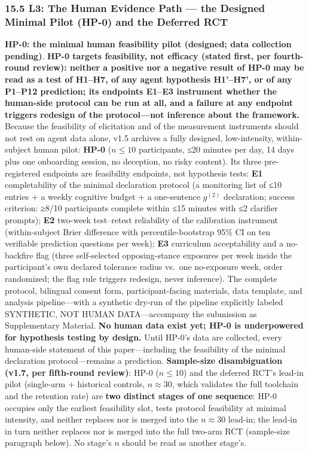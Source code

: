 \documentclass[
  11pt]{article}
\begin{document}
\subsubsection{15.5 L3: The Human Evidence Path --- the Designed Minimal
Pilot (HP-0) and the Deferred
RCT}\label{l3-the-human-evidence-path-the-designed-minimal-pilot-hp-0-and-the-deferred-rct}

\textbf{HP-0: the minimal human feasibility pilot (designed; data
collection pending)}. \textbf{HP-0 targets feasibility, not efficacy
(stated first, per fourth-round review): neither a positive nor a
negative result of HP-0 may be read as a test of H1--H7, of any agent
hypothesis H1'--H7', or of any P1--P12 prediction; its endpoints E1--E3
instrument whether the human-side protocol can be run at all, and a
failure at any endpoint triggers redesign of the protocol---not
inference about the framework.} Because the feasibility of elicitation
and of the measurement instruments should not rest on agent data alone,
v1.5 archives a fully designed, low-intensity, within-subject human
pilot: \textbf{HP-0} (\(n \le 10\) participants, ≤20 minutes per day, 14
days plus one onboarding session, no deception, no risky content). Its
three pre-registered endpoints are feasibility endpoints, not hypothesis
tests: \textbf{E1} completability of the minimal declaration protocol (a
monitoring list of ≤10 entries + a weekly cognitive budget + a
one-sentence \(g^{(2)}\) declaration; success criterion: ≥8/10
participants complete within ≤15 minutes with ≤2 clarifier prompts);
\textbf{E2} two-week test--retest reliability of the calibration
instrument (within-subject Brier difference with percentile-bootstrap
95\% CI on ten verifiable prediction questions per week); \textbf{E3}
curriculum acceptability and a no-backfire flag (three self-selected
opposing-stance exposures per week inside the participant's own declared
tolerance radius vs.~one no-exposure week, order randomized; the flag
rule triggers redesign, never inference). The complete protocol,
bilingual consent form, participant-facing materials, data template, and
analysis pipeline---with a synthetic dry-run of the pipeline explicitly
labeled SYNTHETIC, NOT HUMAN DATA---accompany the submission as
Supplementary Material. \textbf{No human data exist yet; HP-0 is
underpowered for hypothesis testing by design.} Until HP-0's data are
collected, every human-side statement of this paper---including the
feasibility of the minimal declaration protocol---remains a prediction.
\textbf{Sample-size disambiguation (v1.7, per fifth-round review)}: HP-0
(\(n \le 10\)) and the deferred RCT's lead-in pilot (single-arm +
historical controls, \(n \approx 30\), which validates the full
toolchain and the retention rate) are \textbf{two distinct stages of one
sequence}: HP-0 occupies only the earliest feasibility slot, tests
protocol feasibility at minimal intensity, and neither replaces nor is
merged into the \(n \approx 30\) lead-in; the lead-in in turn neither
replaces nor is merged into the full two-arm RCT (sample-size paragraph
below). No stage's \(n\) should be read as another stage's.
\end{document}
